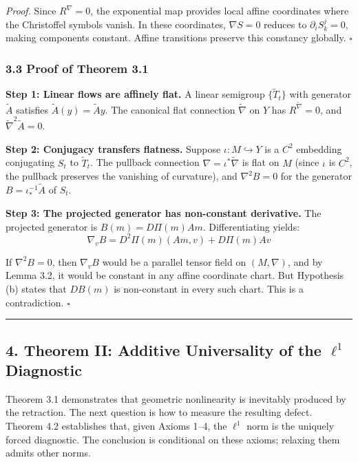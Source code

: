 \documentclass[
]{article}
\begin{document}
\emph{Proof.} Since \(R^{\nabla} = 0\), the exponential map provides
local affine coordinates where the Christoffel symbols vanish. In these
coordinates, \(\nabla S = 0\) reduces to \(\partial_i S^j_k = 0\),
making components constant. Affine transitions preserve this constancy
globally. \(\square\)

\subsubsection{3.3 Proof of Theorem 3.1}\label{proof-of-theorem-3.1}

\textbf{Step 1: Linear flows are affinely flat.} A linear semigroup
\(\{\tilde{T}_t\}\) with generator \(\tilde{A}\) satisfies
\(\tilde{A}(y) = \tilde{A} y\). The canonical flat connection
\(\tilde{\nabla}\) on \(Y\) has \(R^{\tilde{\nabla}} = 0\), and
\(\tilde{\nabla}^2 \tilde{A} = 0\).

\textbf{Step 2: Conjugacy transfers flatness.} Suppose
\(\iota: M \hookrightarrow Y\) is a \(C^2\) embedding conjugating
\(S_t\) to \(\tilde{T}_t\). The pullback connection
\(\nabla = \iota^* \tilde{\nabla}\) is flat on \(M\) (since \(\iota\) is
\(C^2\), the pullback preserves the vanishing of curvature), and
\(\nabla^2 B = 0\) for the generator \(B = \iota^{-1}_* \tilde{A}\) of
\(S_t\).

\textbf{Step 3: The projected generator has non-constant derivative.}
The projected generator is \(B(m) = D\Pi(m)Am\). Differentiating yields:
\[\nabla_v B = D^2\Pi(m)(Am, v) + D\Pi(m)Av\]

If \(\nabla^2 B = 0\), then \(\nabla_v B\) would be a parallel tensor
field on \((M, \nabla)\), and by Lemma 3.2, it would be constant in any
affine coordinate chart. But Hypothesis (b) states that \(DB(m)\) is
non-constant in every such chart. This is a contradiction. \(\square\)

\begin{center}\rule{0.5\linewidth}{0.5pt}\end{center}

\subsection{\texorpdfstring{4. Theorem II: Additive Universality of the
\(\ell^1\)
Diagnostic}{4. Theorem II: Additive Universality of the \textbackslash ell\^{}1 Diagnostic}}\label{theorem-ii-additive-universality-of-the-ell1-diagnostic}

Theorem 3.1 demonstrates that geometric nonlinearity is inevitably
produced by the retraction. The next question is how to measure the
resulting defect. Theorem 4.2 establishes that, given Axioms 1--4, the
\(\ell^1\) norm is the uniquely forced diagnostic. The conclusion is
conditional on these axioms; relaxing them admits other norms.
\end{document}
